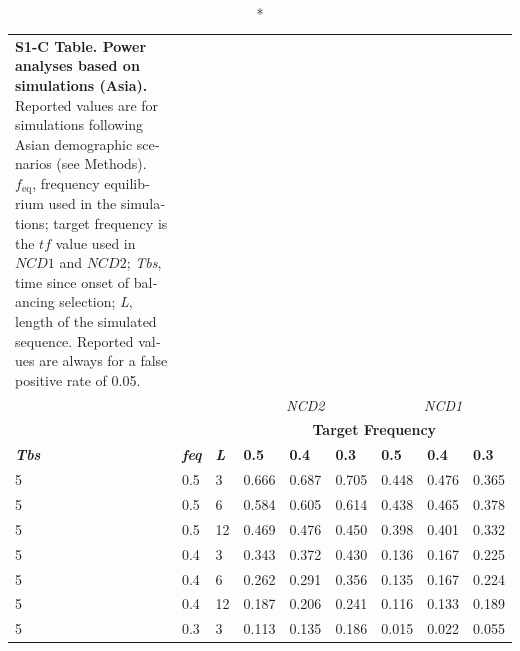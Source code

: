 \begin{refsection}
\begin{otherlanguage}{english}
\begin{scriptsize}
\begin{longtable}{lllllllll}
\end{longtable}
\end{scriptsize}
\begin{scriptsize}
\begin{longtable}{lllllllll}
\caption*{\textbf{S1-C Table. Power analyses based on simulations (Asia).} Reported values are for simulations following Asian demographic scenarios (see Methods). $f_{\mathrm{eq}}$, frequency equilibrium used in the simulations; target frequency is the $tf$ value used in $NCD1$ and $NCD2$; \emph{Tbs}, time since onset of balancing selection; \emph{L}, length of the simulated sequence. Reported values are always for a false positive rate of 0.05.} \\
\cline{4-9}
\multicolumn{3}{c}{} & \multicolumn{3}{c}{\cellcolor[HTML]{C0C0C0}\textit{NCD2}} & \multicolumn{3}{c}{\cellcolor[HTML]{C0C0C0}\textit{NCD1}} \\ \cline{4-9} 
\multicolumn{3}{c}{} & \multicolumn{6}{c}{\cellcolor[HTML]{9B9B9B}\textbf{Target Frequency}} \\
\cellcolor[HTML]{9B9B9B}\textit{\textbf{Tbs}} & \cellcolor[HTML]{9B9B9B}\textit{\textbf{feq}} & \cellcolor[HTML]{9B9B9B}\textit{\textbf{L}} & \textbf{0.5} & \textbf{0.4} & \textbf{0.3} & \textbf{0.5} & \textbf{0.4} & \textbf{0.3} \\
\cellcolor[HTML]{C0C0C0}5 & \cellcolor[HTML]{C0C0C0}0.5 & \cellcolor[HTML]{C0C0C0}3 & 0.666 & 0.687 & 0.705 & 0.448 & 0.476 & 0.365 \\
\cellcolor[HTML]{C0C0C0}5 & \cellcolor[HTML]{C0C0C0}0.5 & \cellcolor[HTML]{C0C0C0}6 & 0.584 & 0.605 & 0.614 & 0.438 & 0.465 & 0.378 \\
\cellcolor[HTML]{C0C0C0}5 & \cellcolor[HTML]{C0C0C0}0.5 & \cellcolor[HTML]{C0C0C0}12 & 0.469 & 0.476 & 0.450 & 0.398 & 0.401 & 0.332 \\
\cellcolor[HTML]{C0C0C0}5 & \cellcolor[HTML]{C0C0C0}0.4 & \cellcolor[HTML]{C0C0C0}3 & 0.343 & 0.372 & 0.430 & 0.136 & 0.167 & 0.225 \\
\cellcolor[HTML]{C0C0C0}5 & \cellcolor[HTML]{C0C0C0}0.4 & \cellcolor[HTML]{C0C0C0}6 & 0.262 & 0.291 & 0.356 & 0.135 & 0.167 & 0.224 \\
\cellcolor[HTML]{C0C0C0}5 & \cellcolor[HTML]{C0C0C0}0.4 & \cellcolor[HTML]{C0C0C0}12 & 0.187 & 0.206 & 0.241 & 0.116 & 0.133 & 0.189 \\
\cellcolor[HTML]{C0C0C0}5 & \cellcolor[HTML]{C0C0C0}0.3 & \cellcolor[HTML]{C0C0C0}3 & 0.113 & 0.135 & 0.186 & 0.015 & 0.022 & 0.055 \\

\end{longtable}
\end{scriptsize}
\end{otherlanguage}
\end{refsection}
